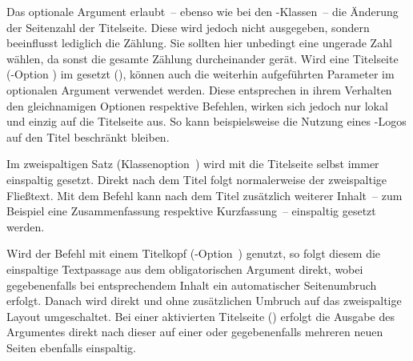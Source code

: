 \begin{DeclareEntity*}{}
\begin{DeclareEntity*}{}
\begin{DeclareEntity*}{}
\begin{Declaration}
\begin{Declaration}
\begin{Declaration}
\begin{Declaration}
\begin{Declaration}
\begin{Declaration}
\begin{Declaration}
\begin{Declaration}
\begin{Declaration}
\begin{Declaration}
\begin{Declaration}
Das optionale Argument erlaubt~-- ebenso wie bei den \KOMAScript-Klassen~-- die
Änderung der Seitenzahl der Titelseite. Diese wird jedoch nicht ausgegeben, 
sondern beeinflusst lediglich die Zählung. Sie sollten hier unbedingt eine 
ungerade Zahl wählen, da sonst die gesamte Zählung durcheinander gerät. 
Wird eine Titelseite (\KOMAScript-Option ) im \TUDCD 
gesetzt (), können auch die weiterhin aufgeführten 
Parameter im optionalen Argument verwendet werden. Diese entsprechen in ihrem 
Verhalten den gleichnamigen Optionen respektive Befehlen, wirken sich jedoch 
nur lokal und einzig auf die Titelseite aus. So kann beispielsweise die Nutzung 
eines \DDC-Logos auf den Titel beschränkt bleiben.
\end{Declaration}
\end{Declaration}
\end{Declaration}
\end{Declaration}
\end{Declaration}
\end{Declaration}
\end{Declaration}
\end{Declaration}
\end{Declaration}
\end{Declaration}
\end{Declaration}

\begin{Declaration}
  {}
Im zweispaltigen Satz (Klassenoption~) wird mit 
 die Titelseite selbst immer einspaltig gesetzt. Direkt nach 
dem Titel folgt normalerweise der zweispaltige Fließtext. Mit dem Befehl 
 kann nach dem Titel zusätzlich weiterer 
Inhalt~-- zum Beispiel eine Zusammenfassung respektive Kurzfassung~-- 
einspaltig gesetzt werden.

Wird der Befehl mit einem Titelkopf 
(\KOMAScript-Option~) genutzt, so folgt diesem die 
einspaltige Textpassage aus dem obligatorischen Argument direkt, wobei 
gegebenenfalls bei entsprechendem Inhalt ein automatischer Seitenumbruch 
erfolgt. Danach wird direkt und ohne zusätzlichen Umbruch auf das zweispaltige 
Layout umgeschaltet. Bei einer aktivierten Titelseite () 
erfolgt die Ausgabe des Argumentes  direkt nach dieser 
auf einer oder gegebenenfalls mehreren neuen Seiten ebenfalls einspaltig. 


\end{Declaration}
\end{DeclareEntity*}
\end{DeclareEntity*}
\end{DeclareEntity*}
